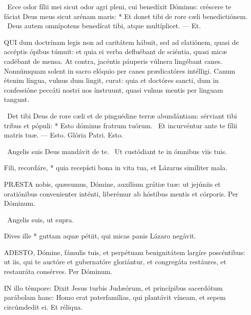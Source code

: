 \R\ Ecce odor fílii mei sicut odor agri pleni, cui benedíxit Dóminus: créscere te fáciat Deus meus sicut arénam maris: * Et donet tibi de rore cæli benedictiónem. \V\ Deus autem omnípotens benedícat tibi, atque multíplicet. --- Et.


\lettrine[lines=2]{Q}{UI} dum doctrínam legis non ad caritátem hábuit, sed ad elatiónem, quasi de accéptis ópibus túmuit: et quia ei verba defluébant de sciéntia, quasi micæ cadébant de mensa. At contra, jacéntis páuperis vúlnera lingébant canes. Nonnúmquam solent in sacro elóquio per canes prædicatóres intélligi. Canum étenim língua, vulnus dum lingit, curat: quia et doctóres sancti, dum in confessióne peccáti nostri nos ínstruunt, quasi vulnus mentis per linguam tangunt.

\R\ Det tibi Deus de rore cæli et de pinguédine terræ abundántiam: sérviant tibi tribus et pópuli: * Esto dóminus fratrum tuórum. \V\ Et incurvéntur ante te fílii matris tuæ. --- Esto. Glória Patri. Esto.

\V\ Angelis suis Deus mandávit de te. \R\ Ut custódiant te in ómnibus viis tuis.

 Fili, recordáre, * quia recepísti bona in vita tua, et Lázarus simíliter mala.


\lettrine[lines=2]{P}{RÆSTA} nobis, quæsumus, Dómine, auxílium grátiæ tuæ: ut jejúniis et oratiónibus convenienter inténti, liberémur ab hóstibus mentis et córporis. Per Dóminum.

\V\ Angelis suis, ut supra.

 Dives ille * guttam aquæ pétiit, qui micas panis Lázaro negávit.


\lettrine[lines=2]{A}{DESTO}, Dómine, fámulis tuis, et perpétuam benignitátem largíre poscéntibus: ut iis, qui te auctóre et gubernatóre gloriántur, et congregáta restáures, et restauráta consérves. Per Dóminum.

\sectionornament




\lettrine[lines=2]{I}{N} illo témpore: Dixit Jesus turbis Judæórum, et princípibus sacerdótum parábolam hanc: Homo erat paterfamílias, qui plantávit víneam, et sepem circúmdedit ei. Et réliqua.

